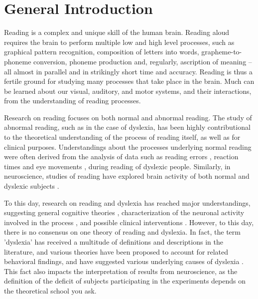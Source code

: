 \chapter*{General Introduction}

Reading is a complex and unique skill of the human brain. Reading aloud requires the brain to perform multiple low and high level processes, such as graphical pattern recognition, composition of letters into words, grapheme-to-phoneme conversion, phoneme production and, regularly, ascription of meaning – all almost in parallel and in strikingly short time and accuracy. Reading is thus a fertile ground for studying many processes that take place in the brain. Much can be learned about our visual, auditory, and motor systems, and their interactions, from the understanding of reading processes.

Research on reading focuses on both normal and abnormal reading. The study of abnormal reading, such as in the case of dyslexia, has been highly contributional to the theoretical understanding of the process of reading itself, as well as for clinical purposes. Understandings about the processes underlying normal reading were often derived from the analysis of data such as reading errors \citep{mn73, ck12}, reaction times \citep{s98, s00} and eye movements \citep{jainta2011dyslexic}, during reading of dyslexic people. Similarly, in neuroscience, studies of reading have explored brain activity of both normal and dyslexic subjects \citep{gaab2007neural, shaywitz2002disruption, price2012review}.

To this day, research on reading and dyslexia has reached major understandings, suggesting general cognitive theories \cite{stanovich1988explaining, vellutino1995semantic, ramus2003relationship, amitay2003reply, ck12}, characterization of the neuronal activity involved in the process \citep{joubert2004neural, gaab2007neural, dehaene2010children}, and possible clinical interventions \citep{coltheart1989treatment, aylward2003instructional, kipp2008remediation}. However, to this day, there is no consensus on one theory of reading and dyslexia. In fact, the term 'dyslexia' has received a multitude of definitions and descriptions in the literature, and various theories have been proposed to account for related behavioral findings, and have suggested various underlying causes of dyslexia \citep{eg14}. This fact also impacts the interpretation of results from neuroscience, as the definition of the deficit of subjects participating in the experiments depends on the theoretical school you ask. 

